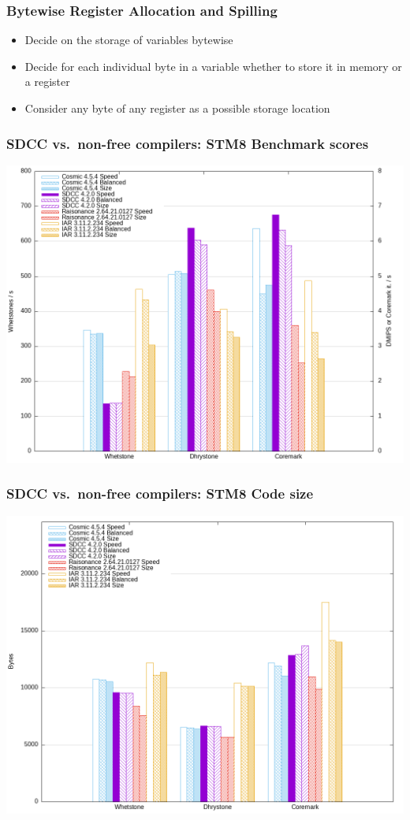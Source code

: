 \documentclass[xcolor=dvipsnames]{beamer}
\begin{document}
\begin{frame}
	\frametitle{Bytewise Register Allocation and Spilling}
	\begin{itemize}
		\item Decide on the storage of variables bytewise
		\item Decide for each individual byte in a variable whether to store it in memory or a register
		\item Consider any byte of any register as a possible storage location
	\end{itemize}
\end{frame}

\begin{frame}
	\frametitle{SDCC vs.\ non-free compilers: STM8 Benchmark scores}
	\centerline{\includegraphics[scale=0.38]{scores-2022.png}}
\end{frame}

\begin{frame}
	\frametitle{SDCC vs.\ non-free compilers: STM8 Code size}
	\centerline{\includegraphics[scale=0.38]{sizes-2022.png}}
\end{frame}
\end{document}
